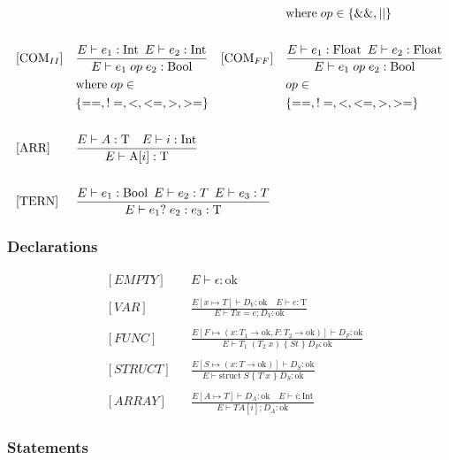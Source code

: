 \begin{align*}
& & & & & & &\text{where}\; op \in \{\&\&, ||\}\\\\
%
&[\text{COM}_{II}]           &  &\frac{E \vdash e_1 : \text{Int} \enskip E \vdash e_2 : \text{Int}}{E \vdash e_1\; op \;e_2 : \text{Bool}} & &[\text{COM}_{FF}]           &  &\frac{E \vdash e_1 : \text{Float} \enskip E \vdash e_2 : \text{Float}}{E \vdash e_1\; op \;e_2 : \text{Bool}}\\    
& & &\text{where}\; op \in & & & &op \in\\
& & &\{==, !=, <, <=, >, >=\}  & & & &\{==, !=, <, <=, >, >=\}\\\\
%
&[\text{ARR}]      &    &\frac{E \vdash A : \text{T}\quad E \vdash i : \text{Int}}{E \vdash \text{A[}i\text{]} : \text{T}}\\\\
%
&[\text{TERN}]      &    &\frac{E \vdash e_1 : \text{Bool} \enskip E \vdash e_2 : T \enskip E \vdash e_3 : T}{E \vdash e_1 ?\; e_2 : e_3 : \text{T}} \span\span\span\span\span
\end{align*}

\subsubsection{Declarations}

\begin{align*}
&[EMPTY] & &E \vdash \epsilon : \text{ok}\\\\
%
&[VAR] & &\frac{E[x \mapsto T] \vdash D_V : \text{ok}\quad E \vdash e : \text{T}}{E \vdash T x = e; D_V : \text{ok}}\\\\
%
&[FUNC] & &\frac{E[F \mapsto (x : T_1 \rightarrow \text{ok}, F : T_2 \rightarrow \text{ok})] \vdash D_F : \text{ok}}{E \vdash T_1\; (T_2\; x)\; \{\; St\; \}\; D_P : \text{ok}}\\\\
%
&[STRUCT] & &\frac{E[S \mapsto (x : T \rightarrow \text{ok})] \vdash D_S : \text{ok}}{E \vdash \text{struct}\; S\; \{\;T\; x\;\}\; D_S: \text{ok}}\\\\
%
&[ARRAY] & &\frac{E[A \mapsto T] \vdash D_A : \text{ok} \quad E \vdash i : \text{Int}}{E \vdash T A [i]; D_A : \text{ok}}
\end{align*}

\subsubsection{Statements}

